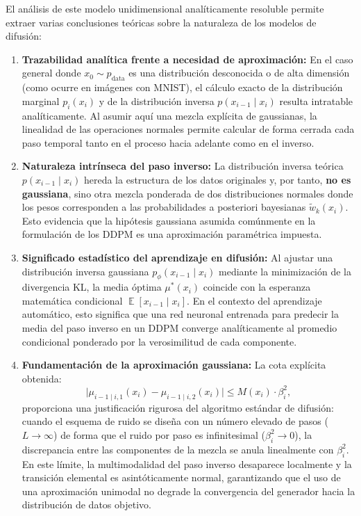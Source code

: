 \documentclass[11pt,a4paper]{article}
\DeclareMathOperator{\E}{\mathbb{E}}
\begin{document}
El análisis de este modelo unidimensional analíticamente resoluble permite extraer varias conclusiones teóricas sobre la naturaleza de los modelos de difusión:

\begin{enumerate}
    \item \textbf{Trazabilidad analítica frente a necesidad de aproximación:} 
    En el caso general donde $x_0 \sim p_{\text{data}}$ es una distribución desconocida o de alta dimensión (como ocurre en imágenes con MNIST), el cálculo exacto de la distribución marginal $p_i(x_i)$ y de la distribución inversa $p(x_{i-1} \mid x_i)$ resulta intratable analíticamente. Al asumir aquí una mezcla explícita de gaussianas, la linealidad de las operaciones normales permite calcular de forma cerrada cada paso temporal tanto en el proceso hacia adelante como en el inverso.

    \item \textbf{Naturaleza intrínseca del paso inverso:}
    La distribución inversa teórica $p(x_{i-1} \mid x_i)$ hereda la estructura de los datos originales y, por tanto, \textbf{no es gaussiana}, sino otra mezcla ponderada de dos distribuciones normales donde los pesos corresponden a las probabilidades a posteriori bayesianas $\tilde{w}_k(x_i)$. Esto evidencia que la hipótesis gaussiana asumida comúnmente en la formulación de los DDPM es una aproximación paramétrica impuesta.

    \item \textbf{Significado estadístico del aprendizaje en difusión:}
    Al ajustar una distribución inversa gaussiana $p_\phi(x_{i-1} \mid x_i)$ mediante la minimización de la divergencia KL, la media óptima $\mu^*(x_i)$ coincide con la esperanza matemática condicional $\E[x_{i-1} \mid x_i]$. En el contexto del aprendizaje automático, esto significa que una red neuronal entrenada para predecir la media del paso inverso en un DDPM converge analíticamente al promedio condicional ponderado por la verosimilitud de cada componente.

    \item \textbf{Fundamentación de la aproximación gaussiana:}
    La cota explícita obtenida:
    \[
    \big|\mu_{i-1\mid i, 1}(x_i) - \mu_{i-1\mid i, 2}(x_i)\big| \le M(x_i) \cdot \beta_i^2,
    \]
    proporciona una justificación rigurosa del algoritmo estándar de difusión: cuando el esquema de ruido se diseña con un número elevado de pasos ($L \to \infty$) de forma que el ruido por paso es infinitesimal ($\beta_i^2 \to 0$), la discrepancia entre las componentes de la mezcla se anula linealmente con $\beta_i^2$. En este límite, la multimodalidad del paso inverso desaparece localmente y la transición elemental es asintóticamente normal, garantizando que el uso de una aproximación unimodal no degrade la convergencia del generador hacia la distribución de datos objetivo.
\end{enumerate}
\end{document}
